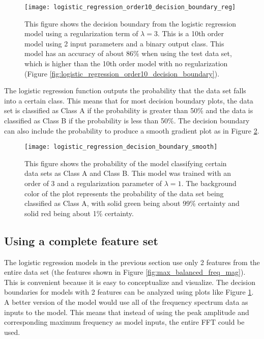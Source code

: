 \begin{figure}
	\centering
	\texttt{[image: logistic\_regression\_order10\_decision\_boundary\_reg]}
	\decoRule
	\caption{This figure shows the decision boundary from the logistic regression model using a regularization term of $\lambda=3$.  This is a 10th order model using 2 input parameters and a binary output class.  This model has an accuracy of about 86\% when using the test data set, which is higher than the 10th order model with no regularization (Figure \ref{fig:logistic_regression_order10_decision_boundary}).}
	\label{fig:logistic_regression_order10_decision_boundary_reg}
\end{figure}

The logistic regression function outputs the probability that the data set falls into a certain class.  This means that for most decision boundary plots, the data set is classified as Class A if the probability is greater than 50\% and the data is classified as Class B if the probability is less than 50\%.  The decision boundary can also include the probability to produce a smooth gradient plot as in Figure \ref{fig:logistic_regression_decision_boundary_smooth}.

\begin{figure}
	\centering
	\texttt{[image: logistic\_regression\_decision\_boundary\_smooth]}
	\decoRule
	\caption{This figure shows the probability of the model classifying certain data sets as Class A and Class B.  This model was trained with an order of 3 and a regularization parameter of $\lambda=1$.  The background color of the plot represents the probability of the data set being classified as Class A, with solid green being about 99\% certainty and solid red being about 1\% certainty.}
	\label{fig:logistic_regression_decision_boundary_smooth}
\end{figure}



\subsection{Using a complete feature set}
The logistic regression models in the previous section use only 2 features from the entire data set (the features shown in Figure \ref{fig:max_balanced_freq_mag}).  This is convenient because it is easy to conceptualize and visualize.  The decision boundaries for models with 2 features can be analyzed using plots like Figure \ref{fig:logistic_regression_order10_decision_boundary_reg}.  A better version of the model would use all of the frequency spectrum data as inputs to the model.  This means that instead of using the peak amplitude and corresponding maximum frequency as model inputs, the entire FFT could be used.


